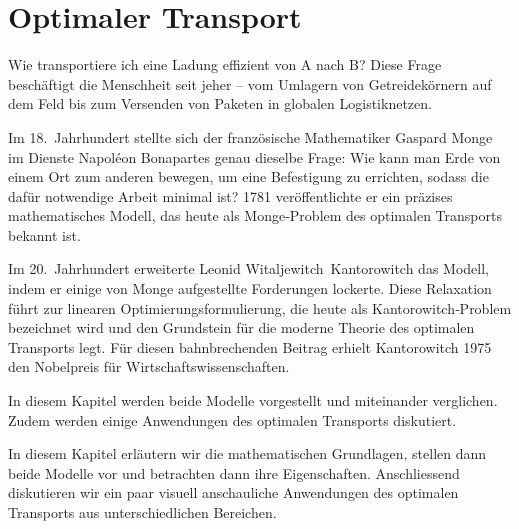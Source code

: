 %
%
%
%
\newcommand{\wasserstein}[1][p]{\mathcal{W}_{#1}}
\chapter{Optimaler Transport\label{chapter:mongekant}}
\begin{refsection}

\noindent
Wie transportiere ich eine Ladung effizient von A nach B?
Diese Frage beschäftigt die Menschheit seit jeher --
vom Umlagern von Getreidekörnern auf dem Feld
bis zum Versenden von Paketen in globalen Logistiknetzen.

Im 18.~Jahrhundert stellte sich der französische Mathematiker Gaspard Monge
im Dienste Napoléon Bonapartes genau dieselbe Frage:
Wie kann man Erde von einem Ort zum anderen bewegen,
um eine Befestigung zu errichten,
sodass die dafür notwendige Arbeit minimal ist?
1781 veröffentlichte er ein präzises mathematisches Modell,
das heute als Monge‑Problem des optimalen Transports bekannt ist.

Im 20.~Jahrhundert erweiterte Leonid Witaljewitch~Kantorowitch das Modell,
indem er einige von Monge aufgestellte Forderungen lockerte.
Diese Relaxation führt zur linearen Optimierungsformulierung,
die heute als Kantorowitch‑Problem bezeichnet wird
und den Grundstein für die moderne Theorie des optimalen Transports legt.
Für diesen bahnbrechenden Beitrag erhielt Kantorowitch 1975
den Nobelpreis für Wirtschaftswissenschaften.

In diesem Kapitel werden beide Modelle vorgestellt und miteinander verglichen.
Zudem werden einige Anwendungen des optimalen Transports diskutiert.

In diesem Kapitel erläutern wir die mathematischen Grundlagen,
stellen dann beide Modelle vor und betrachten dann ihre Eigenschaften.
Anschliessend diskutieren wir ein paar visuell anschauliche Anwendungen
des optimalen Transports aus unterschiedlichen Bereichen.






\printbibliography[heading=subbibliography]
\end{refsection}
